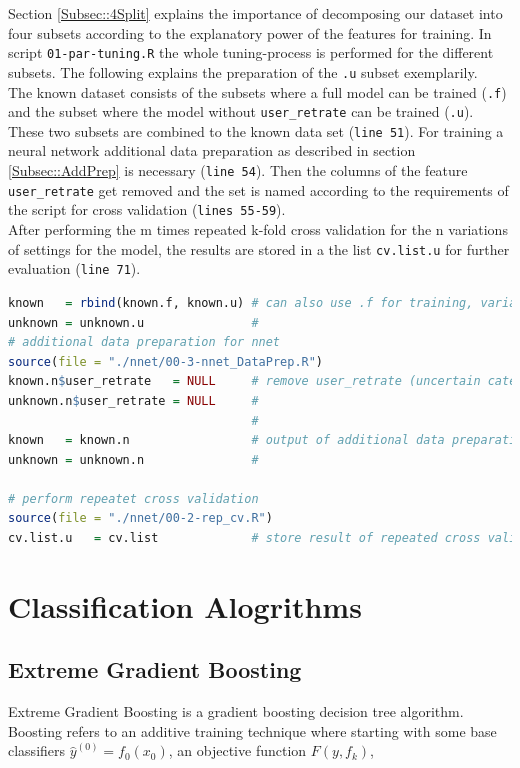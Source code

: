 \documentclass[a4paper,12pt]{article}
\begin{document}
Section \ref{Subsec::4Split} explains the importance of decomposing our dataset into four subsets according to the explanatory power of the features for training. In script \texttt{01-par-tuning.R} the whole tuning-process is performed for the different subsets. The following explains the preparation of the \texttt{.u} subset exemplarily.\\
The known dataset consists of the subsets where a full model can be trained (\texttt{.f}) and the subset where the model without \texttt{user\_retrate} can be trained (\texttt{.u}). These two subsets are combined to the known data set (\texttt{line 51}). For training a neural network additional data preparation as described in section \ref{Subsec::AddPrep} is necessary (\texttt{line 54}). Then the columns of the feature \texttt{user\_retrate} get removed and the set is named according to the requirements of the script for cross validation (\texttt{lines 55-59}). \\
After performing the m times repeated k-fold cross validation for the n variations of settings for the model, the results are stored in a the list \texttt{cv.list.u} for further evaluation (\texttt{line 71}).
\newpage
\begin{lstlisting}[language=r]
known   = rbind(known.f, known.u) # can also use .f for training, variables are pure
unknown = unknown.u               #
# additional data preparation for nnet
source(file = "./nnet/00-3-nnet_DataPrep.R")
known.n$user_retrate   = NULL     # remove user_retrate (uncertain categories)
unknown.n$user_retrate = NULL     #
                                  #
known   = known.n                 # output of additional data preparation
unknown = unknown.n               #

# perform repeatet cross validation
source(file = "./nnet/00-2-rep_cv.R")
cv.list.u   = cv.list             # store result of repeated cross validation

\end{lstlisting}



\section{Classification Alogrithms}\label{Sec::Algorit}

\subsection{Extreme Gradient Boosting}
Extreme Gradient Boosting is a gradient boosting decision tree algorithm. Boosting refers to an additive training technique where starting with some base classifiers $\hat{y}^{(0)}= f_0(x_0)$, an objective function $F(y,f_k)$,
\end{document}
